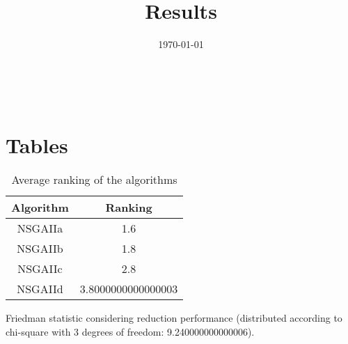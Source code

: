 \documentclass{article}
\title{Results}
\author{}
\date{\today}
\begin{document}
\oddsidemargin 0in \topmargin 0in\maketitle
\
\section{Tables}
\begin{table}[!htp]
\centering
\caption{Average ranking of the algorithms}
\begin{tabular}{c|c}
Algorithm&Ranking\\
\hline
NSGAIIa&1.6\\
NSGAIIb&1.8\\
NSGAIIc&2.8\\
NSGAIId&3.8000000000000003\\
\end{tabular}
\end{table}


Friedman statistic considering reduction performance (distributed according to chi-square with 3 degrees of freedom: 9.240000000000006).
\end{document}
